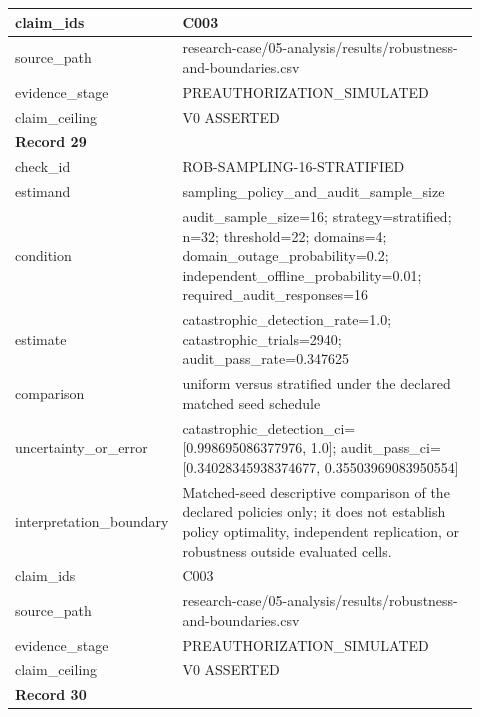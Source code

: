 \begin{longtable}{|p{0.24\linewidth}|p{0.68\linewidth}|}
claim\_\allowbreak{}ids & C003 \\ \hline
source\_\allowbreak{}path & research-case/05-analysis/results/robustness-and-boundaries.csv \\ \hline
evidence\_\allowbreak{}stage & PREAUTHORIZATION\_\allowbreak{}SIMULATED \\ \hline
claim\_\allowbreak{}ceiling & V0 ASSERTED \\ \hline
\multicolumn{2}{|l|}{\textbf{Record 29}} \\ \hline
check\_\allowbreak{}id & ROB-SAMPLING-16-STRATIFIED \\ \hline
estimand & sampling\_\allowbreak{}policy\_\allowbreak{}and\_\allowbreak{}audit\_\allowbreak{}sample\_\allowbreak{}size \\ \hline
condition & audit\_\allowbreak{}sample\_\allowbreak{}size=16;\allowbreak{} strategy=stratified;\allowbreak{} n=32;\allowbreak{} threshold=22;\allowbreak{} domains=4;\allowbreak{} domain\_\allowbreak{}outage\_\allowbreak{}probability=0.2;\allowbreak{} independent\_\allowbreak{}offline\_\allowbreak{}probability=0.01;\allowbreak{} required\_\allowbreak{}audit\_\allowbreak{}responses=16 \\ \hline
estimate & catastrophic\_\allowbreak{}detection\_\allowbreak{}rate=1.0;\allowbreak{} catastrophic\_\allowbreak{}trials=2940;\allowbreak{} audit\_\allowbreak{}pass\_\allowbreak{}rate=0.347625 \\ \hline
comparison & uniform versus stratified under the declared matched seed schedule \\ \hline
uncertainty\_\allowbreak{}or\_\allowbreak{}error & catastrophic\_\allowbreak{}detection\_\allowbreak{}ci=[0.998695086377976, 1.0];\allowbreak{} audit\_\allowbreak{}pass\_\allowbreak{}ci=[0.34028345938374677, 0.35503969083950554] \\ \hline
interpretation\_\allowbreak{}boundary & Matched-seed descriptive comparison of the declared policies only;\allowbreak{} it does not establish policy optimality, independent replication, or robustness outside evaluated cells. \\ \hline
claim\_\allowbreak{}ids & C003 \\ \hline
source\_\allowbreak{}path & research-case/05-analysis/results/robustness-and-boundaries.csv \\ \hline
evidence\_\allowbreak{}stage & PREAUTHORIZATION\_\allowbreak{}SIMULATED \\ \hline
claim\_\allowbreak{}ceiling & V0 ASSERTED \\ \hline
\multicolumn{2}{|l|}{\textbf{Record 30}} \\ \hline

\end{longtable}
